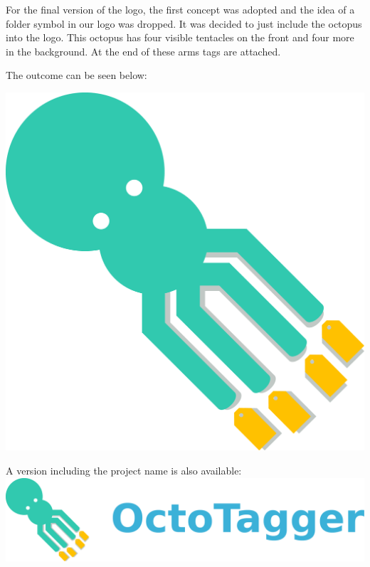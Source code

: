 For the final version of the logo, the first concept was adopted and the idea of a folder symbol in our logo was dropped. It was decided to just include the octopus into the logo. This octopus has four visible tentacles on the front and four more in the background. At the end of these arms tags are attached.

The outcome can be seen below:


\begin{center}
\includegraphics[width=0.5\linewidth]{images/logo.png}

A version including the project name is also available:
\includegraphics[width=\linewidth]{images/logo_text.png}
\end{center}